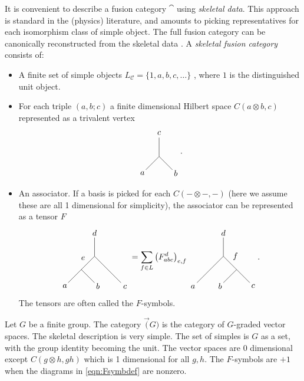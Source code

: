 \begin{definition}
	It is convenient to describe a fusion category $\cat$ using \emph{skeletal data}. This approach is standard in the (physics) literature, and amounts to picking representatives for each isomorphism class of simple object. The full fusion category can be canonically reconstructed from the skeletal data \cite{BBJSkeletal}. A \emph{skeletal fusion category} consists of:
	\begin{itemize}
		\item A finite set of simple objects $L_\mathcal{C}=\{1,a,b,c,\ldots\}$ , where $1$ is the distinguished unit object.
		\item For each triple $(a,b;c)$ a finite dimensional Hilbert space $C(a\otimes b,c)$ represented as a trivalent vertex
		\begin{equation}
		\begin{tikzpicture}[scale=0.8,baseline=(current bounding box.center)]
		\draw (-.707,-.707)--(0,0) node[pos=-.25] {$a$};
		\draw (.707,-.707)--(0,0) node[pos=-.25] {$b$};
		\draw (0,0)--(0,1) node[pos=1.25] {$c$};
		\end{tikzpicture}.
		\end{equation} 
		\item An associator. If a basis is picked for each $C(-\otimes -,-)$ (here we assume these are all 1 dimensional for simplicity), the associator can be represented as a tensor $F$
		\begin{equation}
		\begin{tikzpicture}[scale=0.8,baseline=(current bounding box.center)]
		\draw (0,0)--(0,1) node[pos=1.25] {$d$};
		\draw (0,0)--(1.41,-1.41) node[pos=1.15] {$c$};
		\draw (0,0)--(-.707,-.707) node [pos=.5,above left] {$e$};
		\draw (-.707,-.707)--(-1.41,-1.41)node[pos=1.25] {$a$};
		\draw (-.707,-.707)--(0,-1.41)node[pos=1.25] {$b$};
		\end{tikzpicture}
		=\sum_{f\in L}\left(F_{abc}^{d}\right)_{e,f}
		\begin{tikzpicture}[scale=0.8,baseline=(current bounding box.center)]
		\draw (0,0)--(0,1) node[pos=1.25] {$d$};
		\draw (.707,-.707)--(1.41,-1.41) node[pos=1.25] {$c$};
		\draw (0,0)--(.707,-.707) node [pos=.5,above right] {$f$};
		\draw (0,0)--(-1.41,-1.41)node[pos=1.15] {$a$};
		\draw (.707,-.707)--(0,-1.41)node[pos=1.25] {$b$};
		\end{tikzpicture}.\label{eqn:Fsymbdef}
		\end{equation} 
		The tensors are often called the $F$-symbols.
	\end{itemize}
\end{definition}

\begin{example}[$\Vec(G)$]\label{example:vecG}
	Let $G$ be a finite group. The category $\Vec(G)$ is the category of $G$-graded vector spaces. The skeletal description is very simple. The set of simples is $G$ as a set, with the group identity becoming the unit. The vector spaces are 0 dimensional except $C(g\otimes h, gh)$ which is 1 dimensional for all $g,h$. The $F$-symbols are $+1$ when the diagrams in \eqref{eqn:Fsymbdef} are nonzero.
\end{example}